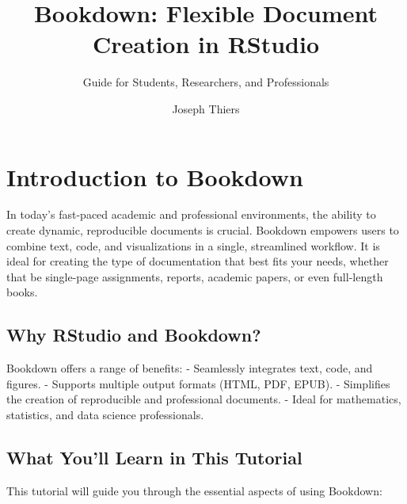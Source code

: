 \documentclass[
]{book}
\title{Bookdown: Flexible Document Creation in RStudio}
\subtitle{Guide for Students, Researchers, and Professionals}
\author{Joseph Thiers}
\date{}
\theoremstyle{definition}
\theoremstyle{definition}
\theoremstyle{definition}
\theoremstyle{definition}
\theoremstyle{remark}
\begin{document}
\maketitle

{
\setcounter{tocdepth}{1}
\tableofcontents
}
\chapter{Introduction to Bookdown}\label{introduction}

In today's fast-paced academic and professional environments, the ability to create dynamic, reproducible documents is crucial. Bookdown empowers users to combine text, code, and visualizations in a single, streamlined workflow. It is ideal for creating the type of documentation that best fits your needs, whether that be single-page assignments, reports, academic papers, or even full-length books.

\section{Why RStudio and Bookdown?}\label{why-rstudio-and-bookdown}

Bookdown offers a range of benefits:
- Seamlessly integrates text, code, and figures.
- Supports multiple output formats (HTML, PDF, EPUB).
- Simplifies the creation of reproducible and professional documents.
- Ideal for mathematics, statistics, and data science professionals.

\section{What You'll Learn in This Tutorial}\label{what-youll-learn-in-this-tutorial}

This tutorial will guide you through the essential aspects of using Bookdown:
\end{document}
